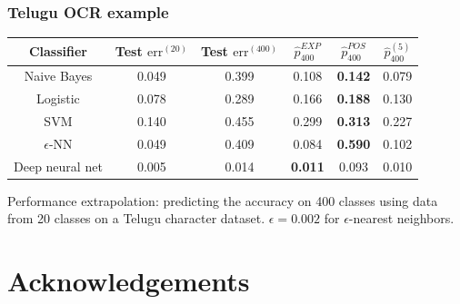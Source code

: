 \documentclass{beamer}
\begin{document}
\begin{frame}
\frametitle{Telugu OCR example}
\begin{center}
\begin{tabular}{|c||c|c|c|c|c|}\hline
Classifier      & Test $\text{err}^{(20)}$ & Test $\text{err}^{(400)}$ & $\hat{p}^{EXP}_{400}$ & $\hat{p}^{POS}_{400}$ & $\hat{p}^{(5)}_{400}$\\ \hline
Naive Bayes     & 0.049                   & 0.399                   & 0.108              & \textbf{0.142}      & 0.079             \\ \hline
Logistic        & 0.078                   & 0.289                   & 0.166              & \textbf{0.188}      & 0.130             \\ \hline
SVM             & 0.140                   & 0.455                   & 0.299              & \textbf{0.313}      & 0.227             \\ \hline
$\epsilon$-NN   & 0.049                   & 0.409                   & 0.084              & \textbf{0.590}      & 0.102             \\ \hline
Deep neural net & 0.005                   & 0.014                   & \textbf{0.011}     & 0.093               & 0.010             \\ \hline
\end{tabular}

Performance extrapolation: predicting the accuracy on 400 classes using data from 20 classes on a Telugu character dataset.
$\epsilon = 0.002$ for $\epsilon$-nearest neighbors.
\end{center}
\end{frame}

\section*{Acknowledgements}

\begin{frame}
\sectionpage
\end{frame}
\end{document}
